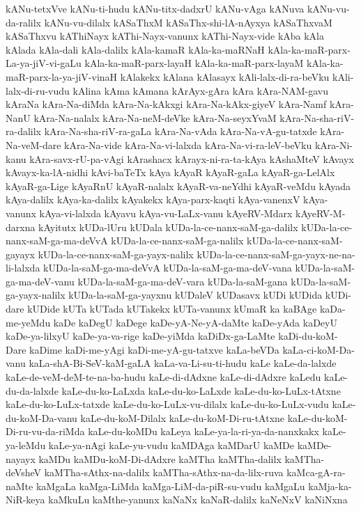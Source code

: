 {kANu-tetxVve
kANu-ti-hudu
kANu-titx-dadxrU
kANu-vAga
kANuva
kANu-vu-da-ralilx
kANu-vu-dilalx
kASaThxM
kASaThx-shi-lA-nAyxya
kASaThxvaM
kASaThxvu
kAThiNayx
kAThi-Nayx-vanunx
kAThi-Nayx-vide
kAba
kAla
kAlada
kAla-dali
kAla-dalilx
kAla-kamaR
kAla-ka-maRNaH
kAla-ka-maR-parx-La-ya-jiV-vi-gaLu
kAla-ka-maR-parx-layaH
kAla-ka-maR-parx-layaM
kAla-ka-maR-parx-la-ya-jiV-vinaH
kAlakekx
kAlana
kAlasayx
kAli-lalx-di-ra-beVku
kAli-lalx-di-ru-vudu
kAlina
kAma
kAmana
kArAyx-gAra
kAra
kAra-NAM-gavu
kAraNa
kAra-Na-diMda
kAra-Na-kAkxgi
kAra-Na-kAkx-giyeV
kAra-Namf
kAra-NanU
kAra-Na-nalalx
kAra-Na-neM-deVke
kAra-Na-seyxYvaM
kAra-Na-sha-riV-ra-dalilx
kAra-Na-sha-riV-ra-gaLa
kAra-Na-vAda
kAra-Na-vA-gu-tatxde
kAra-Na-veM-dare
kAra-Na-vide
kAra-Na-vi-lalxda
kAra-Na-vi-ra-leV-beVku
kAra-Ni-kanu
kAra-savx-rU-pa-vAgi
kArashacx
kArayx-ni-ra-ta-kAya
kAshaMteV
kAvayx
kAvayx-ka-lA-nidhi
kAvi-baTeTx
kAya
kAyaR
kAyaR-gaLa
kAyaR-ga-LelAlx
kAyaR-ga-Lige
kAyaRnU
kAyaR-nalalx
kAyaR-va-neYdhi
kAyaR-veMdu
kAyada
kAya-dalilx
kAya-ka-dalilx
kAyakekx
kAya-parx-kaqti
kAya-vanenxV
kAya-vanunx
kAya-vi-lalxda
kAyavu
kAya-vu-LaLx-vanu
kAyeRV-Mdarx
kAyeRV-M-darxna
kAyitutx
kUDa-lUru
kUDala
kUDa-la-ce-nanx-saM-ga-dalilx
kUDa-la-ce-nanx-saM-ga-ma-deVvA
kUDa-la-ce-nanx-saM-ga-nalilx
kUDa-la-ce-nanx-saM-gayayx
kUDa-la-ce-nanx-saM-ga-yayx-nalilx
kUDa-la-ce-nanx-saM-ga-yayx-ne-na-li-lalxda
kUDa-la-saM-ga-ma-deVvA
kUDa-la-saM-ga-ma-deV-vana
kUDa-la-saM-ga-ma-deV-vanu
kUDa-la-saM-ga-ma-deV-vara
kUDa-la-saM-gana
kUDa-la-saM-ga-yayx-nalilx
kUDa-la-saM-ga-yayxnu
kUDaleV
kUDasavx
kUDi
kUDida
kUDi-dare
kUDide
kUTa
kUTada
kUTakekx
kUTa-vanunx
kUmaR
ka
kaBAge
kaDa-me-yeMdu
kaDe
kaDegU
kaDege
kaDe-yA-Ne-yA-daMte
kaDe-yAda
kaDeyU
kaDe-ya-lilxyU
kaDe-ya-va-rige
kaDe-yiMda
kaDiDx-ga-LaMte
kaDi-du-koM-Dare
kaDime
kaDi-me-yAgi
kaDi-me-yA-gu-tatxve
kaLa-beVDa
kaLa-ci-koM-Da-vanu
kaLa-shA-Bi-SeV-kaM-gaLA
kaLa-va-Li-su-ti-hudu
kaLe
kaLe-da-lalxde
kaLe-de-veM-deM-te-na-ba-hudu
kaLe-di-dAdxne
kaLe-di-dAdxre
kaLedu
kaLe-du-da-lalxde
kaLe-du-ko-LaLxda
kaLe-du-ko-LaLxde
kaLe-du-ko-LuLx-tAtxne
kaLe-du-ko-LuLx-tatxde
kaLe-du-ko-LuLx-vu-dilalx
kaLe-du-ko-LuLx-vudu
kaLe-du-koM-Da-vanu
kaLe-du-koM-Dilalx
kaLe-du-koM-Di-ru-tAtxne
kaLe-du-koM-Di-ru-vu-da-riMda
kaLe-du-koMDu
kaLeya
kaLe-ya-la-ri-ya-da-nanxkakx
kaLe-ya-leMdu
kaLe-ya-nAgi
kaLe-yu-vudu
kaMDAga
kaMDarU
kaMDe
kaMDe-nayayx
kaMDu
kaMDu-koM-Di-dAdxre
kaMTha
kaMTha-dalilx
kaMTha-deVsheV
kaMTha-sAthx-na-dalilx
kaMTha-sAthx-na-da-lilx-ruva
kaMca-gA-ra-naMte
kaMgaLa
kaMga-LiMda
kaMga-LiM-da-piR-su-vudu
kaMgaLu
kaMja-ka-NiR-keya
kaMkuLu
kaMthe-yanunx
kaNaNx
kaNaR-dalilx
kaNeNxV
kaNiNxna
}
